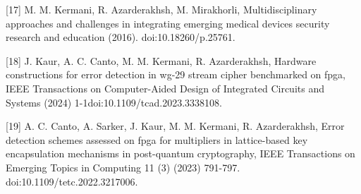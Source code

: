 [17] M. M. Kermani, R. Azarderakhsh, M. Mirakhorli, Multidisciplinary approaches and challenges in integrating emerging medical devices security research and education (2016). \linebreak doi:10.18260/p.25761.


[18] J. Kaur, A. C. Canto, M. M. Kermani, R. Azarderakhsh, Hardware constructions for error detection in wg-29 stream cipher benchmarked on fpga, IEEE Transactions on Computer-Aided Design of Integrated Circuits and Systems (2024) 1-1doi:10.1109/tcad.2023.3338108.

[19] A. C. Canto, A. Sarker, J. Kaur, M. M. Kermani, R. Azarderakhsh, Error detection schemes assessed on fpga for multipliers in lattice-based key encapsulation mechanisms in post-quantum cryptography, IEEE Transactions on Emerging Topics in Computing 11 (3) (2023) 791-797. doi:10.1109/tetc.2022.3217006.


\color{black}



